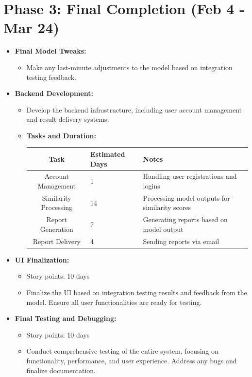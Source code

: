 \documentclass[12pt]{article}
\begin{document}
\section*{Phase 3: Final Completion (Feb 4 - Mar 24)}
\begin{itemize}
    \item \textbf{Final Model Tweaks:}
    \begin{itemize}
        \item Make any last-minute adjustments to the model based on integration testing feedback.
    \end{itemize}

    \item \textbf{Backend Development:}
    \begin{itemize}
        \item Develop the backend infrastructure, including user account management and result delivery systems.
        \item \textbf{Tasks and Duration:}

        \begin{tabular}{|c|p{4cm}|p{4cm}|p{4cm}|}
            \hline
            \textbf{Task} & \textbf{Estimated Days} & \textbf{Notes} \\
            \hline
            Account Management & 1 & Handling user registrations and logins \\
            \hline
            Similarity Processing & 14 &  Processing model outputs for similarity scores \\
            \hline
            Report Generation & 7 & Generating reports based on model output \\
            \hline
            Report Delivery & 4 & Sending reports via email \\
            \hline
        \end{tabular}
    \end{itemize}

    \item \textbf{UI Finalization:}
    \begin{itemize}
        \item Story points: 10 days
        \item Finalize the UI based on integration testing results and feedback from the model. Ensure all user functionalities are ready for testing.
    \end{itemize}

    \item \textbf{Final Testing and Debugging:}
    \begin{itemize}
        \item Story points: 10 days
        \item Conduct comprehensive testing of the entire system, focusing on functionality, performance, and user experience. Address any bugs and finalize documentation.
    \end{itemize}
\end{itemize}
\end{document}
